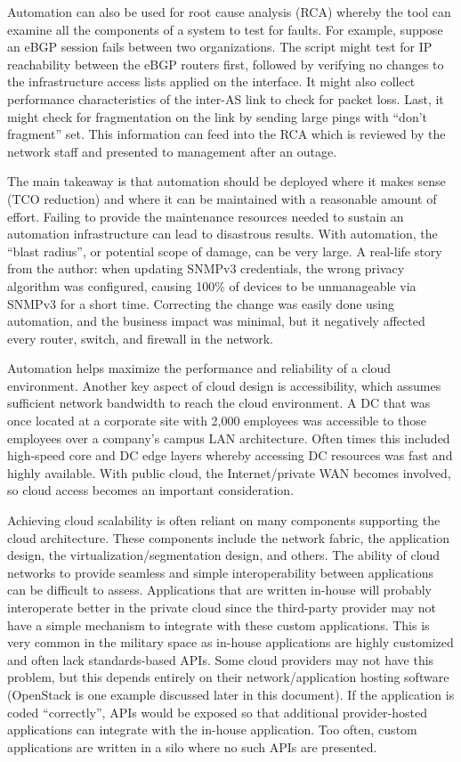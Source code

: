 Automation can also be used for root cause analysis (RCA) whereby the tool can
examine all the components of a system to test for faults. For example,
suppose an eBGP session fails between two organizations. The script might test
for IP reachability between the eBGP routers first, followed by verifying no
changes to the infrastructure access lists applied on the interface. It might
also collect performance characteristics of the inter-AS link to check for
packet loss. Last, it might check for fragmentation on the link by sending
large pings with ``don’t fragment'' set. This information can feed into the RCA
which is reviewed by the network staff and presented to management after an
outage.

The main takeaway is that automation should be deployed where it makes sense
(TCO reduction) and where it can be maintained with a reasonable amount of
effort. Failing to provide the maintenance resources needed to sustain an
automation infrastructure can lead to disastrous results. With automation, the
``blast radius'', or potential scope of damage, can be very large. A real-life
story from the author: when updating SNMPv3 credentials, the wrong privacy
algorithm was configured, causing 100\% of devices to be unmanageable via
SNMPv3 for a short time. Correcting the change was easily done using
automation, and the business impact was minimal, but it negatively affected
every router, switch, and firewall in the network.

Automation helps maximize the performance and reliability of a cloud
environment. Another key aspect of cloud design is accessibility, which
assumes sufficient network bandwidth to reach the cloud environment. A DC that
was once located at a corporate site with 2,000 employees was accessible to
those employees over a company’s campus LAN architecture. Often times this
included high-speed core and DC edge layers whereby accessing DC resources was
fast and highly available. With public cloud, the Internet/private WAN becomes
involved, so cloud access becomes an important consideration.

Achieving cloud scalability is often reliant on many components supporting the
cloud architecture. These components include the network fabric, the
application design, the virtualization/segmentation design, and others. The
ability of cloud networks to provide seamless and simple interoperability
between applications can be difficult to assess. Applications that are written
in-house will probably interoperate better in the private cloud since the
third-party provider may not have a simple mechanism to integrate with these
custom applications. This is very common in the military space as in-house
applications are highly customized and often lack standards-based APIs. Some
cloud providers may not have this problem, but this depends entirely on their
network/application hosting software (OpenStack is one example discussed later
in this document). If the application is coded ``correctly'', APIs would be
exposed so that additional provider-hosted applications can integrate with the
in-house application. Too often, custom applications are written in a silo
where no such APIs are presented.


